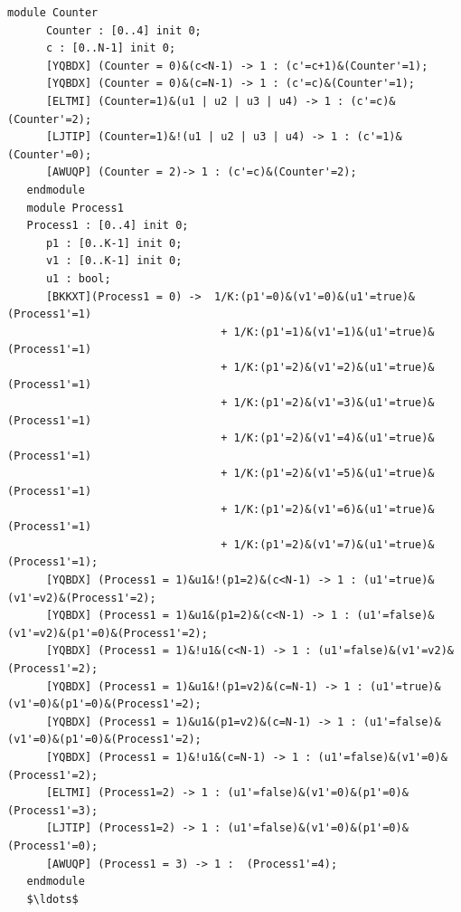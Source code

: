    \begin{lstlisting}[style=prism-color,caption={Part of the generated PRISM model for the Synchronous Leader Election Protocol},captionpos=b,label={leader-prism}]
   module Counter
      Counter : [0..4] init 0;
      c : [0..N-1] init 0;
      [YQBDX] (Counter = 0)&(c<N-1) -> 1 : (c'=c+1)&(Counter'=1);
      [YQBDX] (Counter = 0)&(c=N-1) -> 1 : (c'=c)&(Counter'=1);
      [ELTMI] (Counter=1)&(u1 | u2 | u3 | u4) -> 1 : (c'=c)&(Counter'=2);
      [LJTIP] (Counter=1)&!(u1 | u2 | u3 | u4) -> 1 : (c'=1)&(Counter'=0);
      [AWUQP] (Counter = 2)-> 1 : (c'=c)&(Counter'=2);
   endmodule
   module Process1
   Process1 : [0..4] init 0;
      p1 : [0..K-1] init 0;
      v1 : [0..K-1] init 0;
      u1 : bool;
      [BKKXT](Process1 = 0) ->  1/K:(p1'=0)&(v1'=0)&(u1'=true)&(Process1'=1) 
                                 + 1/K:(p1'=1)&(v1'=1)&(u1'=true)&(Process1'=1) 
                                 + 1/K:(p1'=2)&(v1'=2)&(u1'=true)&(Process1'=1) 
                                 + 1/K:(p1'=2)&(v1'=3)&(u1'=true)&(Process1'=1) 
                                 + 1/K:(p1'=2)&(v1'=4)&(u1'=true)&(Process1'=1) 
                                 + 1/K:(p1'=2)&(v1'=5)&(u1'=true)&(Process1'=1) 
                                 + 1/K:(p1'=2)&(v1'=6)&(u1'=true)&(Process1'=1) 
                                 + 1/K:(p1'=2)&(v1'=7)&(u1'=true)&(Process1'=1);
      [YQBDX] (Process1 = 1)&u1&!(p1=2)&(c<N-1) -> 1 : (u1'=true)&(v1'=v2)&(Process1'=2);
      [YQBDX] (Process1 = 1)&u1&(p1=2)&(c<N-1) -> 1 : (u1'=false)&(v1'=v2)&(p1'=0)&(Process1'=2);
      [YQBDX] (Process1 = 1)&!u1&(c<N-1) -> 1 : (u1'=false)&(v1'=v2)&(Process1'=2);
      [YQBDX] (Process1 = 1)&u1&!(p1=v2)&(c=N-1) -> 1 : (u1'=true)&(v1'=0)&(p1'=0)&(Process1'=2);
      [YQBDX] (Process1 = 1)&u1&(p1=v2)&(c=N-1) -> 1 : (u1'=false)&(v1'=0)&(p1'=0)&(Process1'=2);
      [YQBDX] (Process1 = 1)&!u1&(c=N-1) -> 1 : (u1'=false)&(v1'=0)&(Process1'=2);
      [ELTMI] (Process1=2) -> 1 : (u1'=false)&(v1'=0)&(p1'=0)&(Process1'=3);
      [LJTIP] (Process1=2) -> 1 : (u1'=false)&(v1'=0)&(p1'=0)&(Process1'=0);
      [AWUQP] (Process1 = 3) -> 1 :  (Process1'=4);
   endmodule
   $\ldots$
   \end{lstlisting}
  
